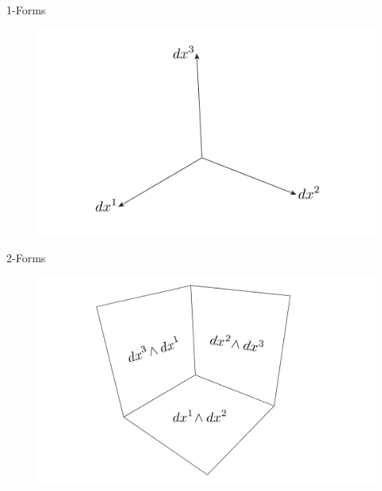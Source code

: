 \documentclass[aspectratio=169]{beamer}
\begin{document}
\begin{frame}{}
\vfill
\begin{figure}[H]
	\centering
	\def\svgwidth{.9\columnwidth}
	
\end{figure}
\vfill
\end{frame}

\begin{frame}{}
\vfill
\begin{figure}[H]
	\centering
	\def\svgwidth{\columnwidth}
	
\end{figure}
\vfill
\end{frame}

\begin{frame}{}
\begin{figure}[H]
	\hspace*{-2cm}
	\def\svgwidth{1.2\columnwidth}
	
\end{figure}
\vfill
\end{frame}

\begin{frame}{1-Forms}
\begin{figure}[H]
    \centering
	\includegraphics[width=.8\columnwidth]{1forms.png}
\end{figure}
\vfill
\end{frame}

\begin{frame}{2-Forms}
\begin{figure}[H]
    \centering
	\includegraphics[width=.8\columnwidth]{2forms.png}
\end{figure}
\vfill
\end{frame}
\end{document}
